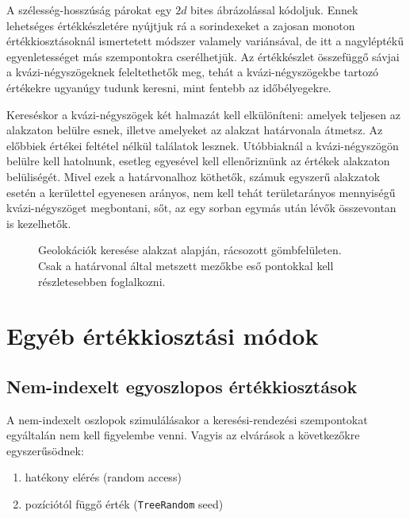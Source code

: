 \documentclass[
    parspace,
    noindent,
    nohyp,
]{elteiktdk}[2023/04/10]
\begin{document}
A szélesség-hosszúság párokat egy $2d$ bites ábrázolással kódoljuk.
Ennek lehetséges értékkészletére nyújtjuk rá a sorindexeket
a zajosan monoton értékkiosztásoknál ismertetett módszer valamely variánsával,
de itt a nagyléptékű egyenletességet más szempontokra cserélhetjük.
Az értékkészlet összefüggő sávjai a kvázi-négyszögeknek feleltethetők meg,
tehát a kvázi-négyszögekbe tartozó értékekre ugyanúgy tudunk keresni,
mint fentebb az időbélyegekre.

Kereséskor a kvázi-négyszögek két halmazát kell elkülöníteni:
amelyek teljesen az alakzaton belülre esnek,
illetve amelyeket az alakzat határvonala átmetsz.
Az előbbiek értékei feltétel nélkül találatok lesznek.
Utóbbiaknál a kvázi-négyszögön belülre kell hatolnunk,
esetleg egyesével kell ellenőriznünk az értékek alakzaton belüliségét.
Mivel ezek a határvonalhoz köthetők,
számuk egyszerű alakzatok esetén a kerülettel egyenesen arányos,
nem kell tehát területarányos mennyiségű kvázi-négyszöget megbontani,
sőt, az egy sorban egymás után lévők összevontan is kezelhetők.

\begin{figure}[H]
\centering

\caption[Geolokációk keresése alakzat alapján]{
    Geolokációk keresése alakzat alapján, rácsozott gömbfelületen. \\
    Csak a határvonal által metszett mezőkbe eső pontokkal kell részletesebben foglalkozni.
}
\end{figure}


\section{Egyéb értékkiosztási módok}

\subsection{Nem-indexelt egyoszlopos értékkiosztások}

A nem-indexelt oszlopok szimulálásakor a keresési-rendezési szempontokat egyáltalán nem kell figyelembe venni.
Vagyis az elvárások a következőkre egyszerűsödnek:

\begin{enumerate}
    \item hatékony elérés (random access)
    \item pozíciótól függő érték (\texttt{TreeRandom} seed)
\end{enumerate}
\end{document}
